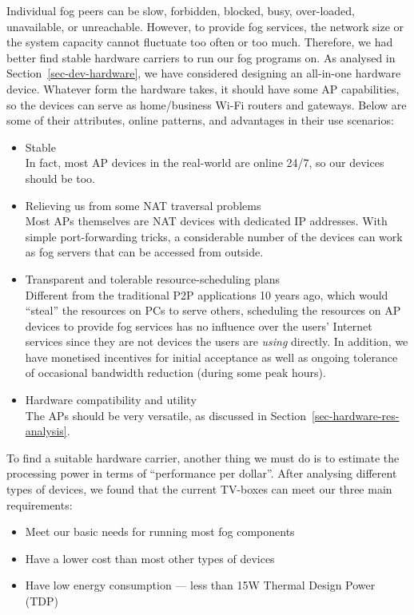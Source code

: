 Individual fog peers can be slow, forbidden, blocked, busy, over-loaded, unavailable, or unreachable. However, to provide fog services, the network size or the system capacity cannot fluctuate too often or too much. Therefore, we had better find stable hardware carriers to run our fog programs on. 
As analysed in Section~\ref{sec-dev-hardware}, we have considered designing an all-in-one hardware device. Whatever form the hardware takes, it should have some AP capabilities, so the devices can serve as home/business Wi-Fi routers and gateways. Below are some of their attributes, online patterns, and advantages in their use scenarios: 
\begin{itemize}
	\item Stable\\
	In fact, most AP devices in the real-world are online 24/7, so our devices should be too.
	\item Relieving us from some NAT traversal problems\\
	Most APs themselves are NAT devices with dedicated IP addresses. With simple port-forwarding tricks, a considerable number of the devices can work as fog servers that can be accessed from outside. 
	\item Transparent and tolerable resource-scheduling plans\\
	Different from the traditional P2P applications 10 years ago, which would ``steal'' the resources on PCs to serve others, scheduling the resources on AP devices to provide fog services has no influence over the users' Internet services since they are not devices the users are \emph{using} directly. In addition, we have monetised incentives for initial acceptance as well as ongoing tolerance of occasional bandwidth reduction (during some peak hours). 
	\item Hardware compatibility and utility\\
	The APs should be very versatile, as discussed in Section~\ref{sec-hardware-res-analysis}. 
\end{itemize}

To find a suitable hardware carrier, another thing we must do is to estimate the processing power in terms of ``performance per dollar''. 
After analysing different types of devices, we found that the current TV-boxes can meet our three main requirements:
\begin{itemize}
	\item Meet our basic needs for running most fog components
	\item Have a lower cost than most other types of devices
	\item Have low energy consumption --- less than 15W Thermal Design Power (TDP)
\end{itemize}

